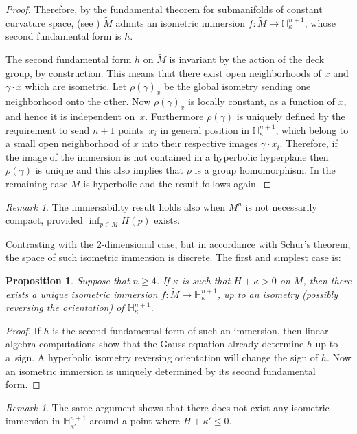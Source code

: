 \documentclass[10pt]{amsart}
\newtheorem{proposition}[theorem]{Proposition}
\theoremstyle{definition}
\theoremstyle{remark}
\newtheorem{remark}[theorem]{Remark}
\numberwithin{equation}{section}
\begin{document}
\begin{proof}
Therefore, by the fundamental theorem for submanifolds of constant curvature
space, (see \cite[Chap.\,7, \S C, Th.\,21]{S}) $\widetilde{M}$
admits an isometric immersion $f:\widetilde{M}\to \mathbb H_{\kappa}^{n+1}$, whose
second fundamental form is $h$.

The second fundamental form $h$ on $\widetilde{M}$ is invariant
by the action of the deck group, by construction. This means that there exist
open neighborhoods of $x$ and $\gamma\cdot x$ which are isometric.
Let $\rho(\gamma)_x$ be the global isometry sending one neighborhood onto the
other. Now $\rho(\gamma)_x$ is locally constant, as a function of $x$,
and hence it is independent on~$x$. Furthermore $\rho(\gamma)$ is
uniquely defined by the requirement to send $n+1$ points~$x_i$
in general position in $\mathbb H_{\kappa}^{n+1}$, which belong to
a small open neighborhood of $x$ into their respective
images $\gamma\cdot x_i$. Therefore, if the image of the immersion is
not contained in a hyperbolic hyperplane then $\rho(\gamma)$ is unique
and this also implies that $\rho$ is a group homomorphism.
In the remaining case $M$ is hyperbolic and the result follows again.
\end{proof}

\begin{remark}
The immersability result holds also when $M^n$ is not
necessarily compact, provided $\inf_{p\in M} H(p)$ exists.
\end{remark}

Contrasting with the 2-dimensional case, but in accordance with Schur's
theorem, the space of such isometric immersion is discrete. The first
and simplest case is:
\begin{proposition}\label{unique-immerse}
Suppose that $n\geq4$. If $\kappa$ is such that $H+\kappa >0$ on $M$, then
there exists a unique isometric immersion
$f:\widetilde{M}\to \mathbb H_{\kappa}^{n+1}$, up
to an isometry (possibly reversing the orientation) of $\mathbb H_{\kappa}^{n+1}$.
\end{proposition}
\begin{proof}
If $h$ is the second fundamental form of such an immersion, then
linear algebra computations show that the Gauss equation already
determine $h$ up to a~sign. A hyperbolic isometry reversing orientation will
change the sign of $h$. Now an isometric
immersion is uniquely determined by its second fundamental form.
\end{proof}
\begin{remark}
The same argument shows that there does not exist any isometric immersion in
$\mathbb H_{\kappa'}^{n+1}$ around a point where $H+\kappa' \leq 0$.
\end{remark}
\end{document}
